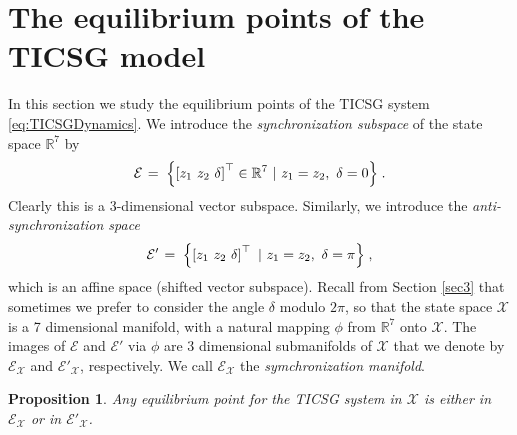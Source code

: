 \documentclass[letterpaper,10pt,conference]{ieeeconf}
\newtheorem{proposition}[theorem]{Proposition}
\newcommand{\rline}  {{\mathbb R}}
\newcommand{\m}      {{\hbox{\hskip 1pt}}}
\newcommand{\Emscr}  {{\mathcal{E}}}
\newcommand{\Xmscr}  {{\mathcal{X}}}
\begin{document}
\section{The equilibrium points of the TICSG model} 
\label{sec4} %

In this section we study the equilibrium points of the TICSG
system \eqref{eq:TICSGDynamics}. We introduce the {\em synchronization 
subspace} of the state space $\rline^7$ by
\begin{equation} \label{eq:SyncSubspace}
   \Emscr \m=\m \left\{ \left[z_1 \ z_2 \ \delta \right]^\top\in
   \rline^7 \ |\ z_1=z_2,\ \delta = 0 \right\} \m.
\end{equation}
Clearly this is a 3-dimensional vector subspace. Similarly, we
introduce the {\em anti-synchronization space}
\begin{equation} \label{eq:AntiSyncSubspace}
   \Emscr' \m=\m \left\{ \left[z_1 \ z_2 \ \delta \right]^\top
   \ |\ z_1=z_2,\ \delta = \pi \right\} \m,
\end{equation}
which is an affine space (shifted vector subspace). Recall from
Section \ref{sec3} that sometimes we prefer to consider the angle
$\delta$ modulo $2\pi$, so that the state space $\Xmscr$ is a 7
dimensional manifold, with a natural mapping $\phi$ from $\rline^7$
onto $\Xmscr$. The images of $\Emscr$ and $\Emscr'$ via $\phi$ are 3
dimensional submanifolds of $\Xmscr$ that we denote by $\Emscr_\Xmscr$
and $\Emscr'_\Xmscr$, respectively. We call $\Emscr_\Xmscr$ the {\em
symchronization manifold}.

\begin{proposition} \label{EqPointsProp1}
Any equilibrium point for the TICSG system in $\Xmscr$ is either in
$\Emscr_\Xmscr$ or in $\Emscr'_\Xmscr$.
\end{proposition}
\end{document}
